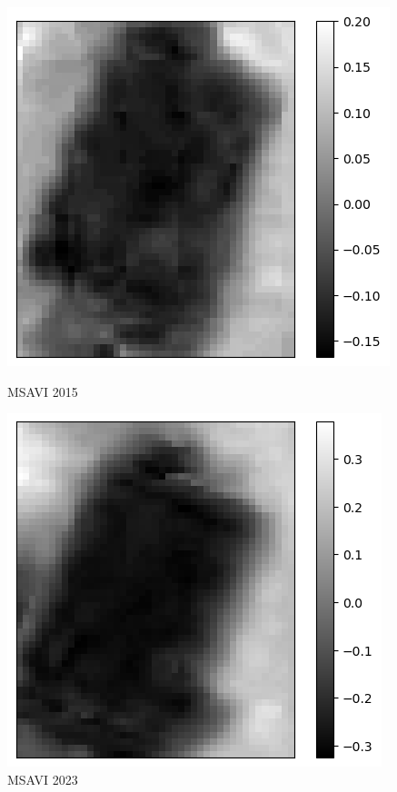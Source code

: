 \documentclass[a4paper,12pt]{article}  %
\begin{document}
\begin{figure}[H]
    \centering
    \begin{minipage}{0.45\textwidth}
        \centering
        \includegraphics[width=\linewidth]{spektralne/msavi_budynek0_2015.png}
        \caption*{MSAVI 2015}
    \end{minipage}
    \begin{minipage}{0.45\textwidth}
        \centering
        \includegraphics[width=\linewidth]{spektralne/msavi_budynek0_2023.png}
        \caption*{MSAVI 2023}
    \end{minipage}
\end{figure}
\end{document}
